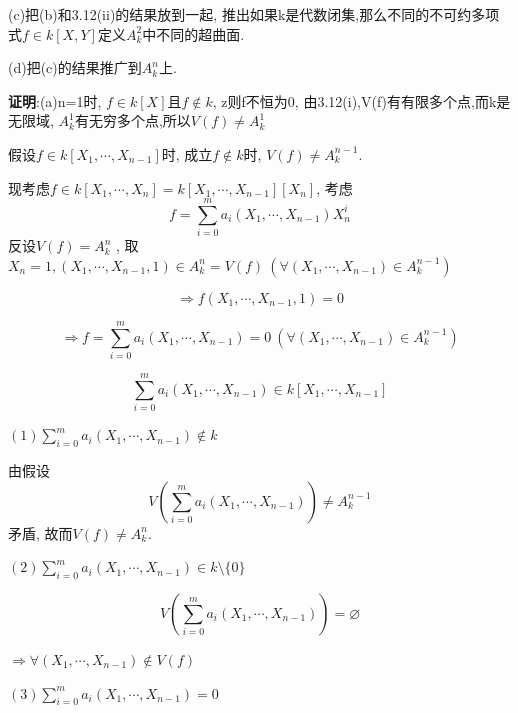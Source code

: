 \documentclass[UTF8]{book}
\begin{document}
	(c)把(b)和3.12(ii)的结果放到一起, 推出如果k是代数闭集,那么不同的不可约多项式$f\in k[X,Y]$定义$A^{2}_{k}$中不同的超曲面.
	
	(d)把(c)的结果推广到$A^{n}_{k}$上.
	
	\textbf{证明}:(a)n=1时, $f\in k[X]$且$f\notin k$, z则f不恒为0, 由3.12(i),V(f)有有限多个点,而k是无限域, $A^{1}_{k}$有无穷多个点,所以$V(f)\neq A^{1}_{k}$
	
	假设$f\in k[X_{1}, \cdots , X_{n-1}]$时, 成立$f\notin k$时, $V(f)\neq A^{n-1}_{k}$.
	
	现考虑$f\in k[X_{1}, \cdots , X_{n}]=k[X_{1}, \cdots , X_{n-1}][X_{n}]$, 考虑
	\begin{equation*}
	f=\sum\limits_{i=0}^m a_{i}(X_{1}, \cdots , X_{n-1})X^{i}_{n}
	\end{equation*}
	反设$V(f)= A^{n}_{k}$ , 取$X_{n}=1,(X_{1}, \cdots , X_{n-1},1)\in A^{n}_{k}=V(f) \ (\forall (X_{1}, \cdots , X_{n-1})\in A^{n-1}_{k}) $
	
	\begin{equation*}
	\Rightarrow f(X_{1}, \cdots , X_{n-1},1)=0
	\end{equation*}
	
	\begin{equation*}
	\Rightarrow f=\sum\limits_{i=0}^m a_{i}(X_{1}, \cdots , X_{n-1})=0   \ (\forall (X_{1}, \cdots , X_{n-1})\in A^{n-1}_{k})
	\end{equation*}
	
	\begin{equation*}
	\sum\limits_{i=0}^m a_{i}(X_{1}, \cdots , X_{n-1})\in k[X_{1}, \cdots , X_{n-1}]
	\end{equation*}
	
	$(1)\sum\limits_{i=0}^m a_{i}(X_{1}, \cdots , X_{n-1})\notin k$
	
	由假设
	\begin{equation*}
	V(\sum\limits_{i=0}^m a_{i}(X_{1}, \cdots , X_{n-1}))\neq  A^{n-1}_{k}
	\end{equation*}
	矛盾, 故而$V(f)\neq A^{n}_{k}$.
	
	$(2)\sum\limits_{i=0}^m a_{i}(X_{1}, \cdots , X_{n-1})\in k\setminus\{0\}$
	
	\begin{equation*}
	V(\sum\limits_{i=0}^m a_{i}(X_{1}, \cdots , X_{n-1}))=  \varnothing
	\end{equation*}
	
	$\Rightarrow \forall (X_{1}, \cdots , X_{n-1})\notin V(f)$
	
	$(3)\sum\limits_{i=0}^m a_{i}(X_{1}, \cdots , X_{n-1})=0$
	
\end{document}
